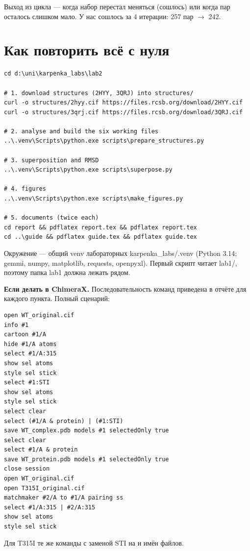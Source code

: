 \documentclass[12pt,a4paper]{article}
\newcommand{\code}[1]{{\ttfamily #1}}
\begin{document}
Выход из цикла --- когда набор перестал меняться (сошлось) или когда пар осталось
слишком мало. У нас сошлось за 4 итерации: 257 пар $\rightarrow$ 242.

\section{Как повторить всё с нуля}

\begin{lstlisting}
cd d:\uni\karpenka_labs\lab2

# 1. download structures (2HYY, 3QRJ) into structures/
curl -o structures/2hyy.cif https://files.rcsb.org/download/2HYY.cif
curl -o structures/3qrj.cif https://files.rcsb.org/download/3QRJ.cif

# 2. analyse and build the six working files
..\.venv\Scripts\python.exe scripts\prepare_structures.py

# 3. superposition and RMSD
..\.venv\Scripts\python.exe scripts\superpose.py

# 4. figures
..\.venv\Scripts\python.exe scripts\make_figures.py

# 5. documents (twice each)
cd report && pdflatex report.tex && pdflatex report.tex
cd ..\guide && pdflatex guide.tex && pdflatex guide.tex
\end{lstlisting}

Окружение --- общий venv лабораторных \code{karpenka\_labs/.venv} (Python 3.14;
\code{gemmi}, \code{numpy}, \code{matplotlib}, \code{requests}, \code{openpyxl}).
Первый скрипт читает \code{lab1/}\allowbreak\code{data/}\allowbreak\code{uniprot\_P00519.json}, поэтому папка \code{lab1}
должна лежать рядом.

\medskip
\noindent\textbf{Если делать в ChimeraX.} Последовательность команд приведена в
отчёте для каждого пункта. Полный сценарий:

\begin{lstlisting}
open WT_original.cif
info #1
cartoon #1/A
hide #1/A atoms
select #1/A:315
show sel atoms
style sel stick
select #1:STI
show sel atoms
style sel stick
select clear
select (#1/A & protein) | (#1:STI)
save WT_complex.pdb models #1 selectedOnly true
select clear
select #1/A & protein
save WT_protein.pdb models #1 selectedOnly true
close session
open WT_original.cif
open T315I_original.cif
matchmaker #2/A to #1/A pairing ss
select #1/A:315 | #2/A:315
show sel atoms
style sel stick
\end{lstlisting}

Для T315I те же команды с заменой \code{STI} на \code{919} и имён файлов.
\end{document}
